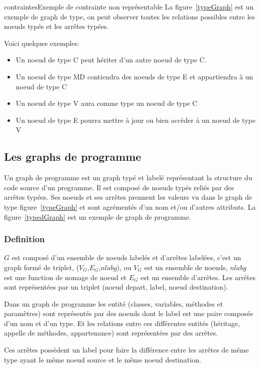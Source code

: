 \documentclass[a4paper, 12pt]{article}
\begin{document}
\begin{figu}{contraintes}{Exemple de contrainte non représentable}
La figure~\ref{typeGraph} est un exemple de graph de type, on peut observer toutes les relations possibles entre les noeuds typés et les arrêtes typées.

Voici quelques exemples:
\begin{itemize}[label=\textbullet]
\item Un noeud de type C peut hériter d'un autre noeud de type C.
\item Un noeud de type MD contiendra des noeuds de type E et appartiendra à un noeud de type C
\item Un noeud de type V aura comme type un noeud de type C
\item Un noeud de type E pourra mettre à jour ou bien accèder à un noeud de type V
\end{itemize}


\subsection{Les graphs de programme}

Un graph de programme est un graph typé et labelé représentant la structure du code source d'un programme. Il est composé de noeuds typés reliés par des arrêtes typées. Ses noeuds et ses arrêtes prennent les valeurs vu dans le graph de type figure~\ref{typeGraph} et sont agrémentés d'un nom et/ou d'autres attributs. La figure~\ref{typedGraph} est un exemple de graph de programme.

\subsubsection{Definition}
\(G \) est composé d'un ensemble de noeuds labelés et d'arrêtes labelées, c'est un graph formé de triplet, ({$V_G$},{$E_G$},\(nlabg \)), ou {$V_G$} est un ensemble de noeuds, \(nlabg \) est une function de nomage de noeud et {$E_G$} est un ensemble d'arrêtes. Les arrêtes sont représentées par un triplet (noeud depart, label, noeud destination).

Dans un graph de programme les entité (classes, variables, méthodes et paramètres) sont représentés par des noeuds dont le label est une paire composée d'un nom et d'un type. Et les relations entre ces différentes entités (héritage, appelle de méthodes, appartenance) sont représentées par des arrêtes.

Ces arrêtes possèdent un label pour faire la différence entre les arrêtes de même type ayant le même noeud source et le même noeud destination.


\end{figu}
\end{document}
